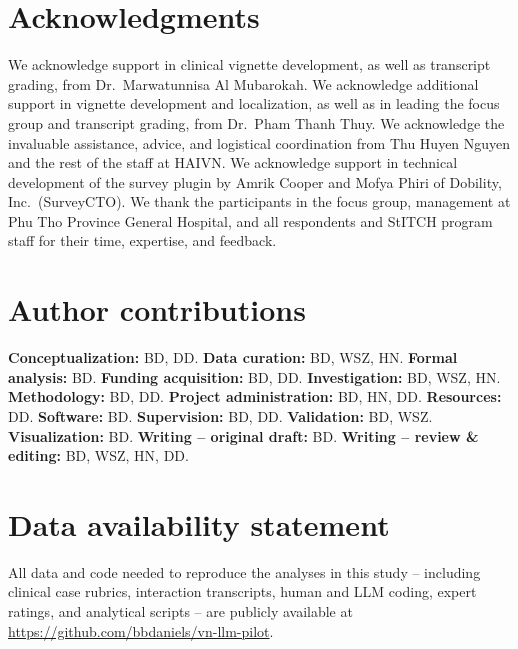 \documentclass{article}
\begin{document}

\section*{Acknowledgments}

We acknowledge support in clinical vignette development, as well as transcript grading, from Dr.\ Marwatunnisa Al Mubarokah. We acknowledge additional support in vignette development and localization, as well as in leading the focus group and transcript grading, from Dr.\ Pham Thanh Thuy. We acknowledge the invaluable assistance, advice, and logistical coordination from Thu Huyen Nguyen and the rest of the staff at HAIVN. We acknowledge support in technical development of the survey plugin by Amrik Cooper and Mofya Phiri of Dobility, Inc.\ (SurveyCTO). We thank the participants in the focus group, management at Phu Tho Province General Hospital, and all respondents and StITCH program staff for their time, expertise, and feedback.


\newpage




\newpage

\section*{Author contributions}

\noindent \textbf{Conceptualization:} BD, DD.
\textbf{Data curation:} BD, WSZ, HN.
\textbf{Formal analysis:} BD.
\textbf{Funding acquisition:} BD, DD.
\textbf{Investigation:} BD, WSZ, HN.
\textbf{Methodology:} BD, DD.
\textbf{Project administration:} BD, HN, DD.
\textbf{Resources:} DD.
\textbf{Software:} BD.
\textbf{Supervision:} BD, DD.
\textbf{Validation:} BD, WSZ.
\textbf{Visualization:} BD.
\textbf{Writing -- original draft:} BD.
\textbf{Writing -- review \& editing:} BD, WSZ, HN, DD.

\section*{Data availability statement}

All data and code needed to reproduce the analyses in this study -- including clinical case rubrics, interaction transcripts, human and LLM coding, expert ratings, and analytical scripts -- are publicly available at \url{https://github.com/bbdaniels/vn-llm-pilot}.
\end{document}
